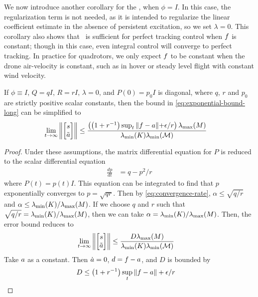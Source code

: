 We now introduce another corollary for the \nfconstant, when $\phi=I$. In this case, the regularization term is not needed, as it is intended to regularize the linear coefficient estimate in the absence of persistent excitation, so we set $\lambda=0$. This corollary also shows that \nfconstant~is sufficient for perfect tracking control when $ f$ is constant; though in this case, even  integral control will converge to perfect tracking. In practice for quadrotors, we only expect $ f$ to be constant when the drone air-velocity is constant, such as in hover or steady level flight with constant wind velocity.
\begin{corollary}
If $\phi\equiv I$, $Q=q I$, $R=r I$, $\lambda=0$, and $P(0)=p_0 I$ is diagonal, where $q$, $r$ and $p_0$ are strictly positive scalar constants, then the bound in \cref{eq:exponential-bound-long} can be simplified to
\begin{align}
    \lim_{t\rightarrow\infty}\left\| \begin{bmatrix}  s \\ \tilde{ a} \end{bmatrix} \right\| &\leq \frac{ \left(\left(1 + r^{-1}\right) \sup_t\| f -  a\| {+ \epsilon/r}\right) \lambda_\text{\normalfont{max}}(M)}{\lambda_\text{\normalfont{min}}(K) \lambda_\text{\normalfont{min}}(\mathcal{M})}
\end{align}
\end{corollary}
\begin{proof}
Under these assumptions, the matrix differential equation for $P$ is reduced to the scalar differential equation
\begin{align}
    \frac{dp}{dt} &= q - p^2/r
\end{align}
where $P(t)=p(t) I$. This equation can be integrated to find that $p$ exponentially converges to $p = \sqrt{q r}$. Then by \cref{eq:convergence-rate}, $\alpha \leq \sqrt{q/r}$ and $\alpha \leq \lambda_\text{\normalfont{min}}(K)/\lambda_\text{\normalfont{max}}(M)$. If we choose $q$ and $r$ such that $\sqrt{q/r} = \lambda_\text{\normalfont{min}}(K)/\lambda_\text{\normalfont{max}}(M)$, then we can take $\alpha = \lambda_\text{\normalfont{min}}(K)/\lambda_\text{\normalfont{max}}(M)$. Then, the error bound reduces to 
\begin{align}
    \lim_{t\rightarrow\infty}\left\| \begin{bmatrix}  s \\ \tilde{ a} \end{bmatrix} \right\| &\leq \frac{D \lambda_\text{\normalfont{max}}(M)}{\lambda_\text{\normalfont{min}}(K) \lambda_\text{\normalfont{min}}(\mathcal{M})}
\end{align}
Take $ a$ as a constant. Then $\dot{ a}=0$, $ d= f -  a$, and $D$ is bounded by
\begin{align}
    D &\leq  \left(1 + r^{-1}\right) \sup_t\| f -  a\| + \epsilon/r
\end{align}

\end{proof}


